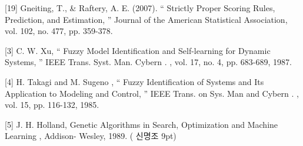 \documentclass[10pt,a4paper]{article}
\begin{document}
[19] Gneiting, T., \& Raftery, A. E. (2007). “ Strictly Proper Scoring Rules, Prediction, and Estimation, ” Journal of the American Statistical Association, vol. 102, no. 477, pp. 359-378.

[3] C. W. Xu, “ Fuzzy Model Identification and Self-learning for Dynamic Systems, ” IEEE Trans. Syst. Man. Cybern . , vol. 17, no. 4, pp. 683-689, 1987.

[4] H. Takagi and M. Sugeno , “ Fuzzy Identification of Systems and Its Application to Modeling and Control, ” IEEE Trans. on Sys. Man and Cybern . , vol. 15, pp. 116-132, 1985.

[5] J. H. Holland, Genetic Algorithms in Search, Optimization and Machine Learning , Addison- Wesley, 1989. ( 신명조 9pt)
\end{document}
